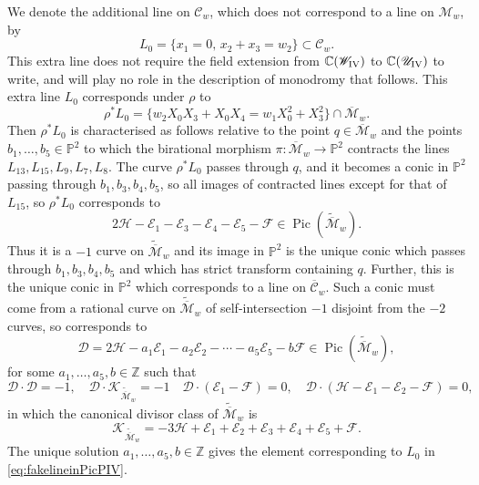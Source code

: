 \documentclass[a4paper,reqno]{amsart}
\numberwithin{equation}{section}
\newcommand{\Z}{\mathbb{Z}}
\newcommand{\C}{\mathbb{C}}
\newcommand{\p}{\mathbb{P}}
\newcommand{\E}{\mathcal{E}}
\newcommand{\F}{\mathcal{F}}
\newcommand{\h}{\mathcal{H}}
\newcommand{\Pic}{\operatorname{Pic}}
\numberwithin{equation}{section}
\begin{document}
We denote the additional line on $\mathcal{C}_w$, which does not correspond to a line on $\mathcal{M}_w$, by
\begin{equation*}
    L_{0} =\{ x_1 = 0,\, x_2+x_3= w_2\}\subset \mathcal{C}_w.
\end{equation*}
This extra line does not require the field extension from $\C(\mathscr{W}_{\rm{IV}})$ to $\C(\mathscr{U}_{\rm{IV}})$ to write, and will play no role in the description of monodromy that follows. 
This extra line $L_0$ corresponds under $\rho$ to 
$$\rho^* L_0 = \{w_2 X_0X_3 +X_0X_4 =w_1 X_0^2+X_3^2\}\cap\overline{\mathcal{M}}_w.$$
Then $\rho^* L_0$ is characterised as follows relative to the point $q\in \overline{\mathcal{M}}_w$ and the points $b_1,\dots,b_{5}\in \p^2$ to which the birational morphism $\pi : \overline{\mathcal{M}}_w\to \p^2$ contracts the lines $L_{13},L_{15},L_{9},L_{7},L_{8}$.
The curve $\rho^* L_0$ passes through $q$, and it becomes a conic in $\p^2$ passing through $b_1,b_3,b_4,b_5$, so all images of contracted lines except for that of $L_{15}$, so $\rho^* L_0$ corresponds to
\begin{equation} \label{eq:fakelineinPicPIV}
2\h -\mathcal{E}_1-\mathcal{E}_3-\mathcal{E}_4-\mathcal{E}_5-\mathcal{F}\in\Pic(\widetilde{\overline{\mathcal{M}}}_w).
\end{equation}
Thus it is a $-1$ curve on $\widetilde{\overline{\mathcal{M}}}_w$ and its image in $\p^2$ is the unique conic which passes through $b_1,b_3,b_4,b_5$ and which has strict transform containing $q$.
Further, this is the unique conic in $\p^2$ which corresponds to a line on $\overline{\mathcal{C}}_w$.
Such a conic must come from a rational curve on $\widetilde{\overline{\mathcal{M}}}_w$ of self-intersection $-1$ disjoint from the $-2$ curves, so corresponds to 
$$\mathcal{D}= 2\h-a_1 \E_1-a_2 \E_2-\cdots -a_5 \E_5 - b \F\in \Pic(\widetilde{\overline{\mathcal{M}}}_w),$$
for some $a_1,\dots,a_5,b\in\Z$ such that 
$$\mathcal{D}\cdot\mathcal{D} = -1, \quad 
\mathcal{D}\cdot\mathcal{K}_{\widetilde{\overline{\mathcal{M}}}_w}= -1 \quad 
\mathcal{D}\cdot(\E_1-\F)=0, \quad 
\mathcal{D}\cdot(\h-\E_1-\E_2-\F)=0,$$
in which the canonical divisor class of $\widetilde{\overline{\mathcal{M}}}_w$ is 
$$\mathcal{K}_{\widetilde{\overline{\mathcal{M}}}_w} = -3 \mathcal{H}+\mathcal{E}_1+\mathcal{E}_2+\mathcal{E}_3+\mathcal{E}_4 + \mathcal{E}_5+\mathcal{F}.$$
The unique solution $a_1,\dots,a_5,b\in\Z$ gives the element corresponding to $L_0$ in \eqref{eq:fakelineinPicPIV}.
\end{document}
